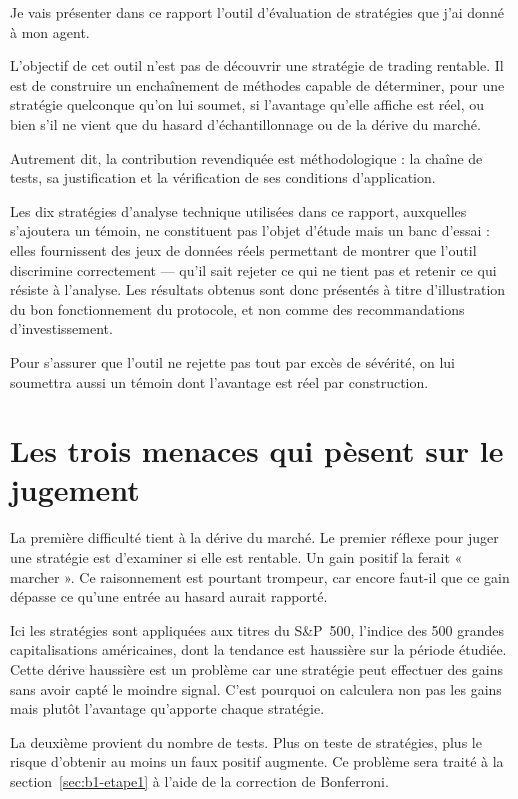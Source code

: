 Je vais présenter dans ce rapport l'outil d'évaluation de stratégies que
j'ai donné à mon agent.

L'objectif de cet outil n'est pas de découvrir une stratégie de trading
rentable. Il est de construire un enchaînement de méthodes capable de
déterminer, pour une stratégie quelconque qu'on lui soumet, si l'avantage
qu'elle affiche est réel, ou bien s'il ne vient que du hasard
d'échantillonnage ou de la dérive du marché.

Autrement dit, la contribution revendiquée est méthodologique :
la chaîne de tests, sa justification et la vérification de ses conditions
d'application. 

Les dix stratégies d'analyse technique utilisées dans ce
rapport, auxquelles s'ajoutera un témoin, ne constituent pas l'objet
d'étude mais un banc d'essai :
elles fournissent des jeux de données réels permettant de
montrer que l'outil discrimine correctement — qu'il sait rejeter
ce qui ne tient pas et retenir ce qui résiste à l'analyse. Les résultats
obtenus sont donc présentés à titre d'illustration du bon
fonctionnement du protocole, et non comme des recommandations
d'investissement.

Pour s'assurer que l'outil ne rejette pas tout par excès de sévérité,
on lui soumettra aussi un témoin dont l'avantage est réel par construction.


\section*{Les trois menaces qui pèsent sur le jugement}
\label{sec:menaces}


La première difficulté tient à la dérive du marché.
Le premier réflexe pour juger une stratégie est d'examiner si elle
est rentable. Un gain positif la ferait « marcher ». Ce raisonnement
est pourtant trompeur, car encore faut-il que ce gain dépasse ce
qu'une entrée au hasard aurait rapporté.

Ici les stratégies sont appliquées aux titres du S\&P~500,
l'indice des 500 grandes capitalisations américaines,
dont la tendance est haussière sur la période étudiée.
Cette dérive haussière est un problème car une stratégie peut effectuer
des gains sans avoir capté le moindre signal.
C'est pourquoi on calculera non pas les gains mais plutôt l'avantage
qu'apporte chaque stratégie.

La deuxième provient du nombre de tests. Plus on teste de stratégies,
plus le risque d'obtenir au moins un faux
positif augmente. Ce problème sera traité à la
section~\ref{sec:b1-etape1} à l'aide de la correction de Bonferroni.

